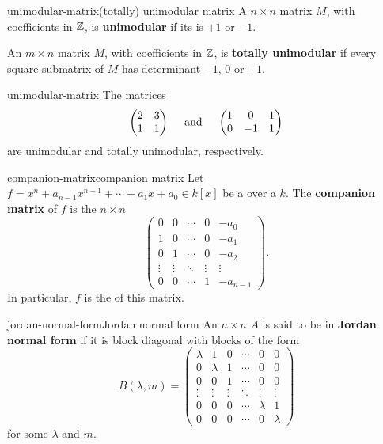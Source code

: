 \begin{topic}{unimodular-matrix}{(totally) unimodular matrix}
    A $n \times n$ matrix $M$, with coefficients in $\mathbb{Z}$, is \textbf{unimodular} if its  is $+1$ or $-1$.
    
    An $m \times n$ matrix $M$, with coefficients in $\mathbb{Z}$, is \textbf{totally unimodular} if every square submatrix of $M$ has determinant $-1$, $0$ or $+1$.
\end{topic}

\begin{example}{unimodular-matrix}
    The matrices
    \[ \begin{pmatrix} 2 & 3 \\ 1 & 1 \end{pmatrix} \quad \textup{ and } \quad \begin{pmatrix} 1 & 0 & 1 \\ 0 & -1 & 1 \end{pmatrix} \]
    are unimodular and totally unimodular, respectively.
\end{example}

\begin{topic}{companion-matrix}{companion matrix}
    Let $f = x^n + a_{n - 1} x^{n - 1} + \cdots + a_1 x + a_0 \in k[x]$ be a  over a  $k$. The \textbf{companion matrix} of $f$ is the $n \times n$ 
    \[ \begin{pmatrix}
        0 & 0 & \cdots & 0 & -a_0 \\
        1 & 0 & \cdots & 0 & -a_1 \\
        0 & 1 & \cdots & 0 & -a_2 \\
        \vdots & \vdots & \ddots & \vdots & \vdots \\
        0 & 0 & \cdots & 1 & -a_{n - 1}
    \end{pmatrix} . \]
    In particular, $f$ is the  of this matrix.
\end{topic}

\begin{topic}{jordan-normal-form}{Jordan normal form}
    An $n \times n$  $A$ is said to be in \textbf{Jordan normal form} if it is block diagonal with blocks of the form
    \[ B(\lambda, m) = \begin{pmatrix}
        \lambda & 1 & 0 & \cdots & 0 & 0 \\
        0 & \lambda & 1 & \cdots & 0 & 0 \\
        0 & 0 & 1 & \cdots & 0 & 0 \\
        \vdots & \vdots & \vdots & \ddots & \vdots & \vdots \\
        0 & 0 & 0 & \cdots & \lambda & 1 \\
        0 & 0 & 0 & \cdots & 0 & \lambda
    \end{pmatrix} \]
    for some $\lambda$ and $m$.
\end{topic}

